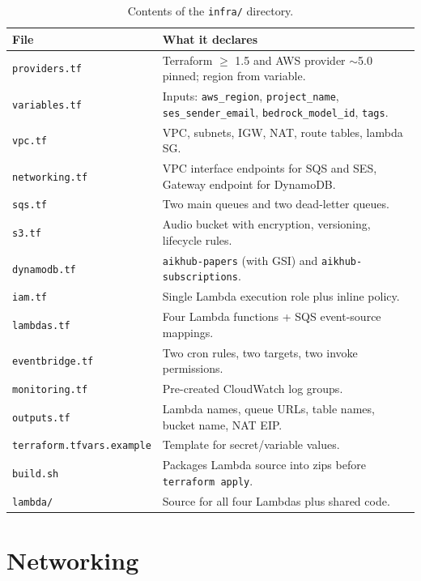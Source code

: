\documentclass[11pt,a4paper]{article}
\begin{document}
\begin{table}[h]
\centering
\begin{tabularx}{\linewidth}{lX}
\toprule
\textbf{File} & \textbf{What it declares} \\
\midrule
\texttt{providers.tf}    & Terraform $\geq$ 1.5 and AWS provider $\sim$5.0 pinned; region from variable. \\
\texttt{variables.tf}    & Inputs: \texttt{aws\_region}, \texttt{project\_name}, \texttt{ses\_sender\_email}, \texttt{bedrock\_model\_id}, \texttt{tags}. \\
\texttt{vpc.tf}          & VPC, subnets, IGW, NAT, route tables, lambda SG. \\
\texttt{networking.tf}   & VPC interface endpoints for SQS and SES, Gateway endpoint for DynamoDB. \\
\texttt{sqs.tf}          & Two main queues and two dead-letter queues. \\
\texttt{s3.tf}           & Audio bucket with encryption, versioning, lifecycle rules. \\
\texttt{dynamodb.tf}     & \texttt{aikhub-papers} (with GSI) and \texttt{aikhub-subscriptions}. \\
\texttt{iam.tf}          & Single Lambda execution role plus inline policy. \\
\texttt{lambdas.tf}      & Four Lambda functions + SQS event-source mappings. \\
\texttt{eventbridge.tf}  & Two cron rules, two targets, two invoke permissions. \\
\texttt{monitoring.tf}   & Pre-created CloudWatch log groups. \\
\texttt{outputs.tf}      & Lambda names, queue URLs, table names, bucket name, NAT EIP. \\
\texttt{terraform.tfvars.example} & Template for secret/variable values. \\
\texttt{build.sh}        & Packages Lambda source into zips before \texttt{terraform apply}. \\
\texttt{lambda/}         & Source for all four Lambdas plus shared code. \\
\bottomrule
\end{tabularx}
\caption{Contents of the \texttt{infra/} directory.}
\end{table}

\section{Networking}
\end{document}
